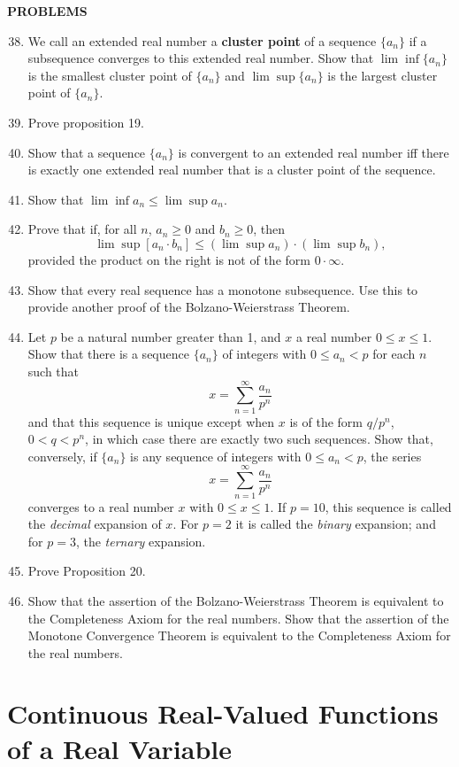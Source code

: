 \documentclass[a4paper,10pt]{book}
\theoremstyle{plain} %
\begin{document}
\begin{center}
	\textbf{PROBLEMS}
\end{center}
\begin{enumerate}
	\setcounter{enumi}{37}
	\item We call an extended real number a \textbf{cluster point} of a sequence $\{ a_n\}$ if a subsequence converges to this extended real number. Show that $\lim \inf \{a_n\}$ is the smallest cluster point of $\{a_n\}$ and $\lim \sup \{a_n\}$ is the largest cluster point of $\{a_n\}$.
	\item Prove proposition 19.
	\item Show that a sequence $\{a_n\}$ is convergent to an extended real number iff there is exactly one extended real number that is a cluster point of the sequence.
	\item Show that $\lim \inf a_n \le \lim \sup a_n$.
	\item Prove that if, for all $n$, $a_n \ge 0$ and $b_n \ge 0 $, then \[ \lim \sup [a_n \cdot b_n] \le (\lim \sup a_n) \cdot (\lim \sup b_n),\] provided the product on the right is not of the form $0 \cdot \infty.$
	\item Show that every real sequence has a monotone subsequence. Use this to provide another proof of the Bolzano-Weierstrass Theorem.
	\item Let $p$ be a natural number greater than 1, and $x$ a real number $0 \le x \le 1.$ Show that there is a sequence $\{a_n\}$ of integers with $0 \le a_n < p$ for each $n$ such that \[ x = \sum_{n=1}^\infty\dfrac{a_n}{p^n} \] 
	and that this sequence is unique except when $x$ is of the form $q/p^n$, $0<q<p^n$, in which case there are exactly two such sequences. Show that, conversely, if $\{a_n\}$ is any sequence of integers with $0\le a_n < p$, the series \[ x = \sum_{n=1}^\infty\dfrac{a_n}{p^n} \] 
	converges to a real number $x$ with $0 \le x \le 1$. If $p = 10$, this sequence is called the \textit{decimal} expansion of $x$. For $p=2$ it is called the \textit{binary} expansion; and for $p=3$, the \textit{ternary} expansion.
	\item Prove Proposition 20.
	\item Show that the assertion of the Bolzano-Weierstrass Theorem is equivalent to the Completeness Axiom for the real numbers. Show that the assertion of the Monotone Convergence Theorem is equivalent to the Completeness Axiom for the real numbers.
\end{enumerate}

\section{Continuous Real-Valued Functions of a Real Variable}
\end{document}
